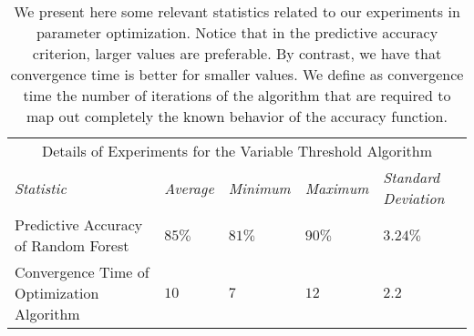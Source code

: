 \documentclass{article}%
\begin{document}
%
\normalsize%
\begin{table}[H]
    \centering
    \scriptsize
    \begin{tabular}{|p{3cm}|p{2cm}|p{2cm}|p{2cm}|p{2cm}|}
      \hline
      \hline
      \multicolumn{5}{c}{Details of Experiments for the Variable Threshold Algorithm}\\
      \cline{1-5}
      \emph{Statistic} & \emph{Average} & \emph{Minimum} & \emph{Maximum} & \emph{Standard Deviation}\\
      \hline
      Predictive Accuracy of Random Forest & {\vspace{0mm}$85\%$} & {\vspace{0mm}$81\%$} & {\vspace{0mm}$90\%$} & {\vspace{0mm}$3.24\%$}\\\hline
      Convergence Time of Optimization Algorithm & {\vspace{0mm}$10$} & {\vspace{0mm}$7$} & {\vspace{0mm}$12$} & {\vspace{0mm}$2.2$}\\\hline
    \end{tabular}
    \caption{\small We present here some relevant statistics related to our experiments in parameter optimization. Notice that in the predictive accuracy criterion, larger values are preferable. By contrast, we have that convergence time is better for smaller values. We define as convergence time the number of iterations of the algorithm that are required to map out completely the known behavior of the accuracy function.}
  \end{table}%
\end{document}
